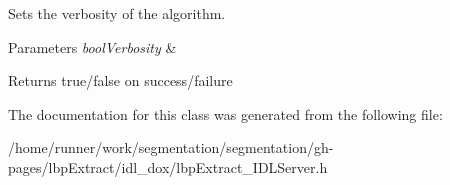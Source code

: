 Sets the verbosity of the algorithm. 


\begin{DoxyParams}{Parameters}
{\em bool\+Verbosity} & \\
\hline
\end{DoxyParams}
\begin{DoxyReturn}{Returns}
true/false on success/failure 
\end{DoxyReturn}


The documentation for this class was generated from the following file\+:\begin{DoxyCompactItemize}
\item 
/home/runner/work/segmentation/segmentation/gh-\/pages/lbp\+Extract/idl\+\_\+dox/lbp\+Extract\+\_\+\+I\+D\+L\+Server.\+h\end{DoxyCompactItemize}
